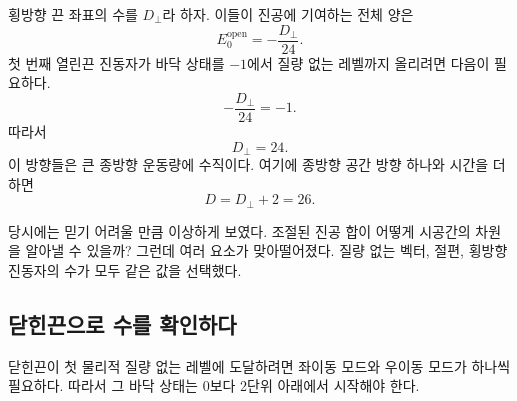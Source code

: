 횡방향 끈 좌표의 수를 \(D_\perp\)라 하자. 이들이 진공에 기여하는 전체 양은
\begin{equation}
  E_0^{\mathrm{open}}
  =-\frac{D_\perp}{24}.
  \label{eq:l05-open-vacuum}
\end{equation}
첫 번째 열린끈 진동자가 바닥 상태를 \(-1\)에서 질량 없는 레벨까지 올리려면 다음이 필요하다.
\begin{equation}
  -\frac{D_\perp}{24}=-1.
\end{equation}
따라서
\begin{equation}
  D_\perp=24.
\end{equation}
이 방향들은 큰 종방향 운동량에 수직이다. 여기에 종방향 공간 방향 하나와 시간을 더하면
\begin{equation}
  D=D_\perp+2=26.
  \label{eq:l05-critical-dimension}
\end{equation}

\begin{classroomqa}\end{classroomqa}

당시에는 믿기 어려울 만큼 이상하게 보였다. 조절된 진공 합이 어떻게 시공간의 차원을 알아낼 수 있을까? 그런데 여러 요소가 맞아떨어졌다. 질량 없는 벡터, 절편, 횡방향 진동자의 수가 모두 같은 값을 선택했다.

\subsection{닫힌끈으로 수를 확인하다}

닫힌끈이 첫 물리적 질량 없는 레벨에 도달하려면 좌이동 모드와 우이동 모드가 하나씩 필요하다. 따라서 그 바닥 상태는 0보다 2단위 아래에서 시작해야 한다.

\begin{classroomqa}\end{classroomqa}

